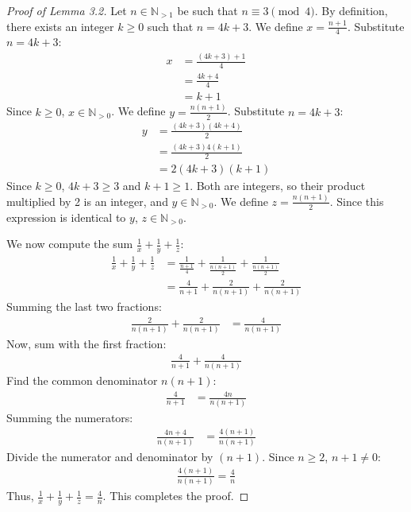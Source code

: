 \documentclass[11pt,a4paper]{article}
\begin{document}
\begin{proof}[Proof of Lemma 3.2]
Let $n \in \mathbb{N}_{>1}$ be such that $n \equiv 3 \pmod 4$.
By definition, there exists an integer $k \geq 0$ such that $n = 4k + 3$.
We define $x = \frac{n+1}{4}$.
Substitute $n = 4k + 3$:
\begin{align*}
x &= \frac{(4k+3)+1}{4} \\
  &= \frac{4k+4}{4} \\
  &= k+1
\end{align*}
Since $k \geq 0$, $x \in \mathbb{N}_{>0}$.
We define $y = \frac{n(n+1)}{2}$.
Substitute $n = 4k + 3$:
\begin{align*}
y &= \frac{(4k+3)(4k+4)}{2} \\
  &= \frac{(4k+3)4(k+1)}{2} \\
  &= 2(4k+3)(k+1)
\end{align*}
Since $k \geq 0$, $4k+3 \geq 3$ and $k+1 \geq 1$. Both are integers, so their product multiplied by 2 is an integer, and $y \in \mathbb{N}_{>0}$.
We define $z = \frac{n(n+1)}{2}$.
Since this expression is identical to $y$, $z \in \mathbb{N}_{>0}$.

We now compute the sum $\frac{1}{x} + \frac{1}{y} + \frac{1}{z}$:
\begin{align*}
\frac{1}{x} + \frac{1}{y} + \frac{1}{z} &= \frac{1}{\frac{n+1}{4}} + \frac{1}{\frac{n(n+1)}{2}} + \frac{1}{\frac{n(n+1)}{2}} \\
&= \frac{4}{n+1} + \frac{2}{n(n+1)} + \frac{2}{n(n+1)}
\end{align*}
Summing the last two fractions:
\begin{align*}
\frac{2}{n(n+1)} + \frac{2}{n(n+1)} &= \frac{4}{n(n+1)}
\end{align*}
Now, sum with the first fraction:
\begin{align*}
\frac{4}{n+1} + \frac{4}{n(n+1)}
\end{align*}
Find the common denominator $n(n+1)$:
\begin{align*}
\frac{4}{n+1} &= \frac{4n}{n(n+1)}
\end{align*}
Summing the numerators:
\begin{align*}
\frac{4n + 4}{n(n+1)} &= \frac{4(n+1)}{n(n+1)}
\end{align*}
Divide the numerator and denominator by $(n+1)$. Since $n \geq 2$, $n+1 \neq 0$:
\begin{align*}
\frac{4(n+1)}{n(n+1)} = \frac{4}{n}
\end{align*}
Thus, $\frac{1}{x} + \frac{1}{y} + \frac{1}{z} = \frac{4}{n}$.
This completes the proof.
\end{proof}
\end{document}
